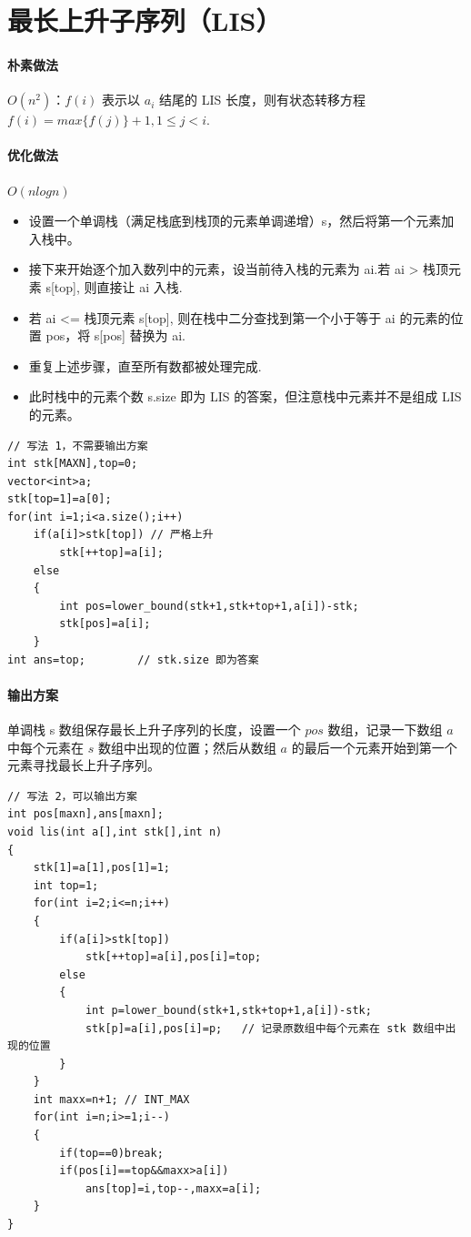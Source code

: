 \section{最长上升子序列（LIS）}
\paragraph{朴素做法} $O(n^2)$：$f(i)$ 表示以 $a_i$ 结尾的 LIS 长度，则有状态转移方程 $f(i) = max\{f(j)\} + 1, 1 \le j < i$.
\paragraph{优化做法}  $O(nlogn)$
\begin{itemize}
    \item 设置一个单调栈（满足栈底到栈顶的元素单调递增）s，然后将第一个元素加入栈中。
    \item 接下来开始逐个加入数列中的元素，设当前待入栈的元素为 ai.若 ai > 栈顶元素 s[top], 则直接让 ai 入栈.
    \item 若 ai <= 栈顶元素 s[top], 则在栈中二分查找到第一个小于等于 ai 的元素的位置 pos，将 s[pos] 替换为 ai.
    \item 重复上述步骤，直至所有数都被处理完成.
    \item 此时栈中的元素个数 s.size 即为 LIS 的答案，但注意栈中元素并不是组成 LIS 的元素。
\end{itemize}

\begin{verbatim}
// 写法 1，不需要输出方案
int stk[MAXN],top=0;
vector<int>a;
stk[top=1]=a[0];
for(int i=1;i<a.size();i++)
    if(a[i]>stk[top]) // 严格上升
        stk[++top]=a[i];
    else
    {
        int pos=lower_bound(stk+1,stk+top+1,a[i])-stk;
        stk[pos]=a[i];
    }
int ans=top;        // stk.size 即为答案
\end{verbatim}
\paragraph{输出方案} 单调栈 s 数组保存最长上升子序列的长度，设置一个 $pos$ 数组，记录一下数组 $a$ 中每个元素在 $s$ 数组中出现的位置；然后从数组 $a$ 的最后一个元素开始到第一个元素寻找最长上升子序列。
\begin{verbatim}
// 写法 2，可以输出方案
int pos[maxn],ans[maxn];
void lis(int a[],int stk[],int n)
{
    stk[1]=a[1],pos[1]=1;
    int top=1;
    for(int i=2;i<=n;i++)
    {
        if(a[i]>stk[top])
            stk[++top]=a[i],pos[i]=top;
        else
        {
            int p=lower_bound(stk+1,stk+top+1,a[i])-stk;
            stk[p]=a[i],pos[i]=p;   // 记录原数组中每个元素在 stk 数组中出现的位置
        }
    }
    int maxx=n+1; // INT_MAX
    for(int i=n;i>=1;i--)
    {
        if(top==0)break;
        if(pos[i]==top&&maxx>a[i])
            ans[top]=i,top--,maxx=a[i];
    }
}
\end{verbatim}